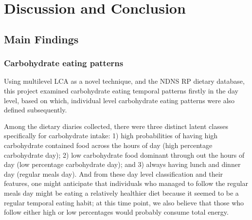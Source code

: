 
\chapter{Discussion and Conclusion} %

\label{Chapter 4} %






\section{Main Findings}

\subsection{Carbohydrate eating patterns}

Using multilevel LCA as a novel technique, and the NDNS RP dietary database, this project examined carbohydrate eating temporal patterns firstly in the day level, based on which, individual level carbohydrate eating patterns were also defined subsequently. 

Among the dietary diaries collected, there were three distinct latent classes specifically for carbohydrate intake: 1) high probabilities of having high carbohydrate contained food across the hours of day (high percentage carbohydrate day); 2) low carbohydrate food dominant through out the hours of day (low percentage carbohydrate day); and 3) always having lunch and dinner day (regular meals day). And from these day level classification and their features, one might anticipate that individuals who managed to follow the regular meals day might be eating a relatively healthier diet because it seemed to be a regular temporal eating habit; at this time point, we also believe that those who follow either high or low percentages would probably consume total energy. 

